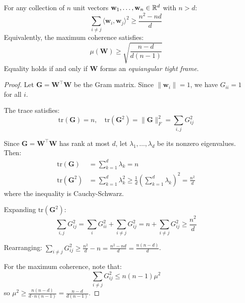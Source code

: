 \begin{theorem}
\label{thm:welch}
For any collection of $n$ unit vectors $\mathbf{w}_1, \ldots, \mathbf{w}_n \in \mathbb{R}^d$ with $n > d$:
\begin{equation}
\sum_{i \neq j} \langle \mathbf{w}_i, \mathbf{w}_j \rangle^2 \geq \frac{n^2 - nd}{d}
\label{eq:welch_sum}
\end{equation}
Equivalently, the maximum coherence satisfies:
\begin{equation}
\mu(\mathbf{W}) \geq \sqrt{\frac{n - d}{d(n-1)}}
\label{eq:welch_max}
\end{equation}
Equality holds if and only if $\mathbf{W}$ forms an \emph{equiangular tight frame}.
\end{theorem}

\begin{proof}
Let $\mathbf{G} = \mathbf{W}^\top \mathbf{W}$ be the Gram matrix. Since $\|\mathbf{w}_i\| = 1$, we have $G_{ii} = 1$ for all $i$.

The trace satisfies:
\begin{equation}
\text{tr}(\mathbf{G}) = n, \quad \text{tr}(\mathbf{G}^2) = \|\mathbf{G}\|_F^2 = \sum_{i,j} G_{ij}^2
\end{equation}

Since $\mathbf{G} = \mathbf{W}^\top \mathbf{W}$ has rank at most $d$, let $\lambda_1, \ldots, \lambda_d$ be its nonzero eigenvalues. Then:
\begin{align}
\text{tr}(\mathbf{G}) &= \sum_{k=1}^d \lambda_k = n \\
\text{tr}(\mathbf{G}^2) &= \sum_{k=1}^d \lambda_k^2 \geq \frac{1}{d}\left(\sum_{k=1}^d \lambda_k\right)^2 = \frac{n^2}{d}
\end{align}
where the inequality is Cauchy-Schwarz.

Expanding $\text{tr}(\mathbf{G}^2)$:
\begin{equation}
\sum_{i,j} G_{ij}^2 = \sum_i G_{ii}^2 + \sum_{i \neq j} G_{ij}^2 = n + \sum_{i \neq j} G_{ij}^2 \geq \frac{n^2}{d}
\end{equation}

Rearranging: $\sum_{i \neq j} G_{ij}^2 \geq \frac{n^2}{d} - n = \frac{n^2 - nd}{d} = \frac{n(n-d)}{d}$.

For the maximum coherence, note that:
\begin{equation}
\sum_{i \neq j} G_{ij}^2 \leq n(n-1) \mu^2
\end{equation}
so $\mu^2 \geq \frac{n(n-d)}{d \cdot n(n-1)} = \frac{n-d}{d(n-1)}$.
\end{proof}

